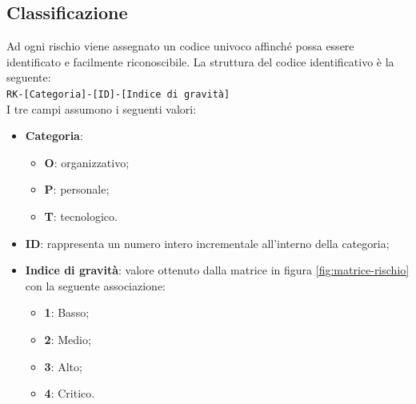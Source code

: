 \documentclass[../piano-di-progetto.tex]{subfiles}
\begin{document}
\subsection{Classificazione}
Ad ogni rischio viene assegnato un codice univoco affinché possa essere identificato e facilmente riconoscibile. La struttura del codice identificativo è la seguente: \\
\texttt{RK-[Categoria]-[ID]-[Indice di gravità]} \\
I tre campi assumono i seguenti valori:
\begin{itemize}
    \item \textbf{Categoria}:
        \begin{itemize}
            \item \textbf{O}: organizzativo;
            \item \textbf{P}: personale;
            \item \textbf{T}: tecnologico.
        \end{itemize}
    \item \textbf{ID}: rappresenta un numero intero incrementale all'interno della categoria;
    \item \textbf{Indice di gravità}: valore ottenuto dalla matrice in figura \ref{fig:matrice-rischio} con la seguente associazione:
        \begin{itemize}
            \item \textbf{1}: Basso;
            \item \textbf{2}: Medio;
            \item \textbf{3}: Alto;
            \item \textbf{4}: Critico.
        \end{itemize}
\end{itemize}
\end{document}
